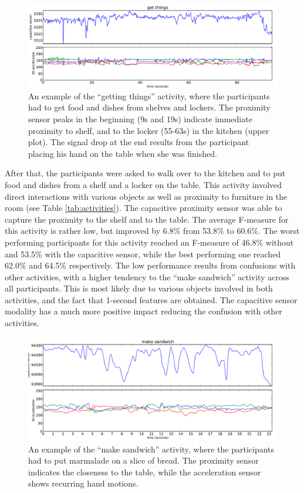 \documentclass[runningheads,a4paper]{llncs}
\begin{document}
\begin{figure}[t]
	\centering
		\includegraphics[width=\textwidth]{../Auswertung/images/tobias_4.pdf}
	\caption{An example of the ``getting things'' activity, where the participants had to get food and dishes from shelves and lockers. The proximity sensor peaks in the beginning (9s and 19s) indicate immediate proximity to shelf, and to the locker (55-63s) in the kitchen (upper plot). The signal drop at the end results from the participant placing his hand on the table when she was finished.}
	\label{fig:get_things}
\end{figure}

After that, the participants were asked to walk over to the kitchen and to put food and dishes from a shelf and a locker on the table. This activity involved direct interactions with various objects as well as proximity to furniture in the room (see Table \ref{tab:activities}). The capacitive proximity sensor was able to capture the proximity to the shelf and to the table. The average F-measure for this activity is rather low, but improved by 6.8\% from 53.8\% to 60.6\%. 
The worst performing participants for this activity reached an F-measure of 46.8\% without and 53.5\% with the capacitive sensor, while the best performing one reached 62.0\% and 64.5\% respectively. The low performance results from confusions with other activities, with a higher tendency to the ``make sandwich'' activity across all participants. This is most likely due to various objects involved in both activities, and the fact that 1-second features are obtained. The capacitive sensor modality has a much more positive impact reducing the confusion with other activities.

\begin{figure}[t]
	\centering
		\includegraphics[width=\textwidth]{../Auswertung/images/eugen_5.pdf}
	\caption{An example of the ``make sandwich'' activity, where the participants had to put marmalade on a slice of bread. The proximity sensor indicates the closeness to the table, while the acceleration sensor shows recurring hand motions.}
	\label{fig:prep_bread}
\end{figure}
\end{document}
